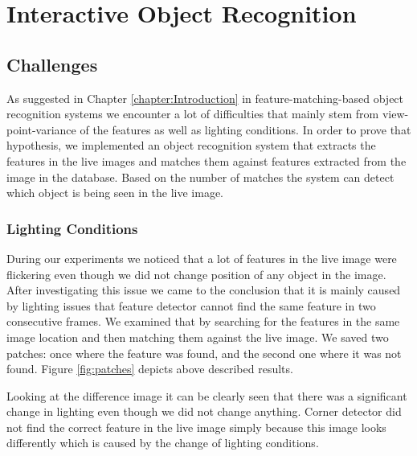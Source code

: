 \chapter{Interactive Object Recognition}
\label{chapter:Object Recognition}

\section{Challenges}
As suggested in Chapter \ref{chapter:Introduction} in feature-matching-based object recognition systems we encounter a lot of difficulties that mainly stem from view-point-variance of the features as well as lighting conditions. In order to prove that hypothesis, we implemented an object recognition system that extracts the features in the  live images and matches them against features extracted from the image in the database. Based on the number of matches the system can detect which object is being seen in the live image.

\subsection{Lighting Conditions}

During our experiments we noticed that a lot of features in the live image were flickering even though we did not change position of any object in the image. After investigating this issue we came to the conclusion that it is mainly caused by lighting issues that feature detector cannot find the same feature in two consecutive frames. We examined that by searching for the features in the same image location and then matching them against the live image. We saved two patches: once where the feature was found, and the second one where it was not found. Figure \ref{fig:patches} depicts above described results.

Looking at the difference image it can be clearly seen that there was a significant change in lighting even though we did not change anything. Corner detector did not find the correct feature in the live image simply because this image looks differently which is caused by the change of lighting conditions.

